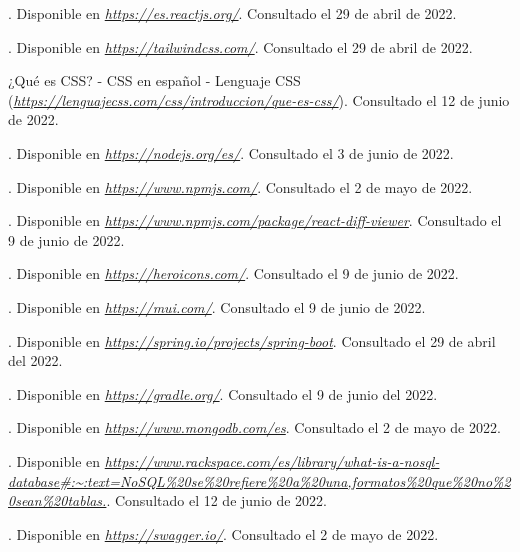 \begin{thebibliography}{99}
. Disponible en {\it \url{https://es.reactjs.org/}}. Consultado el 29 de abril de 2022.

. Disponible en {\it \url{https://tailwindcss.com/}}. Consultado el 29 de abril de 2022.

 ¿Qué es CSS? - CSS en español - Lenguaje CSS ({\it \url{https://lenguajecss.com/css/introduccion/que-es-css/}}). Consultado el 12 de junio de 2022.

. Disponible en {\it \url{https://nodejs.org/es/}}. Consultado el 3 de junio de 2022.

. Disponible en {\it \url{https://www.npmjs.com/}}. Consultado el 2 de mayo de 2022.

. Disponible en {\it \url{https://www.npmjs.com/package/react-diff-viewer}}. Consultado el 9 de junio de 2022.

. Disponible en {\it \url{https://heroicons.com/}}. Consultado el 9 de junio de 2022.

. Disponible en {\it \url{https://mui.com/}}. Consultado el 9 de junio de 2022.

. Disponible en {\it \url{https://spring.io/projects/spring-boot}}. Consultado el 29 de abril del 2022.

. Disponible en {\it \url{https://gradle.org/}}. Consultado el 9 de junio del 2022.

. Disponible en {\it \url{https://www.mongodb.com/es}}. Consultado el 2 de mayo de 2022.

. Disponible en {\it \url{https://www.rackspace.com/es/library/what-is-a-nosql-database#:~:text=NoSQL%20se%20refiere%20a%20una,formatos%20que%20no%20sean%20tablas.}}. Consultado el 12 de junio de 2022.

. Disponible en {\it \url{https://swagger.io/}}. Consultado el 2 de mayo de 2022.


\end{thebibliography}
